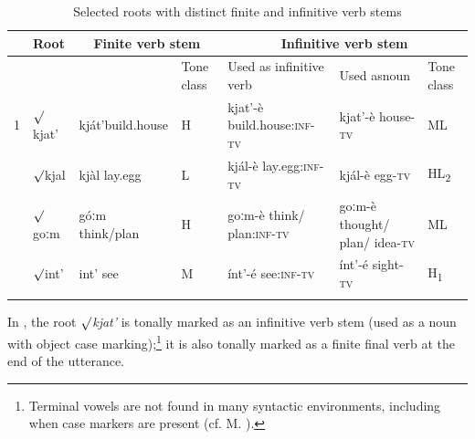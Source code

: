 \documentclass[output=paper]{langsci/langscibook}
\begin{document}
\begin{table}
\caption{Selected roots with distinct finite and infinitive verb stems}
\label{tab:mahland:2}
\begin{tabularx}{\textwidth}{l lp{1.5cm}p{.8cm} Xp{1.5cm}p{.8cm}}

\lsptoprule
 & Root & \multicolumn{2}{c}{ Finite verb stem} & \multicolumn{3}{c}{ Infinitive verb stem}\\
\midrule
&  &  & Tone class & Used as \newline infinitive verb & Used as\newline noun\index{Noun} & Tone class\\
\midrule
1 &
 ${\surd}$kjat' &
  kját'\newline build.\newline house &
  H &
  kjat'-è \newline build.house:\textsc{inf-tv} &
  kjat'-è \newline house\textsc{{}-tv} &
  ML
\\
\tablevspace
2 &
  ${\surd}$kjal &
  kjàl \newline lay.egg &
  L &
  kjál-è \newline lay.egg\textsc{:inf-tv} &
  kjál-è \newline  egg\textsc{{}-tv} &
  HL\textsubscript{2}
\\
\tablevspace
3 &
  ${\surd}$goːm &
  góːm \newline  think/plan &
  H &
  goːm-è \newline  think/ plan\textsc{:inf-tv} &
  goːm-è \newline  thought/ plan/ idea\textsc{{}-tv} &
  ML
\\
\tablevspace
4 &
  ${\surd}$int' &
  int' \newline  see &
  M &
  ínt'-é \newline  see\textsc{:inf-tv} &
  ínt'-é \newline  sight\textsc{{}-tv} &
  H\textsubscript{1}\\
\lspbottomrule
\end{tabularx}
\end{table}

In , the root \textit{${\surd}$kjat'} is tonally marked as an infinitive verb stem (used as a noun with object case marking);\footnote{Terminal vowels are not found in many syntactic environments, including when case markers are present (cf. M. \citealt[313]{Ahland2012}).} it is also tonally marked as a finite final verb at the end of the utterance.  
\end{document}
